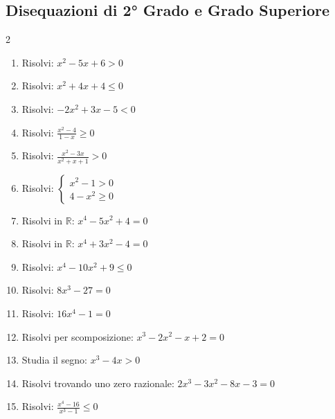 \subsection{Disequazioni di 2° Grado e Grado Superiore}
\begin{multicols}{2}
\begin{enumerate}
    \item {} Risolvi: $x^2 - 5x + 6 > 0$
    \item {} Risolvi: $x^2 + 4x + 4 \le 0$
    \item {} Risolvi: $-2x^2 + 3x - 5 < 0$
    \item {} Risolvi: $\frac{x^2-4}{1-x} \ge 0$
    \item {} Risolvi: $\frac{x^2-3x}{x^2+x+1} > 0$
    \item {} Risolvi: $\begin{cases} x^2-1 > 0 \\ 4-x^2 \ge 0 \end{cases}$
    \item {} Risolvi in $\mathbb{R}$: $x^4 - 5x^2 + 4 = 0$
    \item {} Risolvi in $\mathbb{R}$: $x^4 + 3x^2 - 4 = 0$
    \item {} Risolvi: $x^4 - 10x^2 + 9 \le 0$
    \item {} Risolvi: $8x^3 - 27 = 0$
    \item {} Risolvi: $16x^4 - 1 = 0$
    \item {} Risolvi per scomposizione: $x^3 - 2x^2 - x + 2 = 0$
    \item {} Studia il segno: $x^3 - 4x > 0$
    \item {} Risolvi trovando uno zero razionale: $2x^3 - 3x^2 - 8x - 3 = 0$
    \item {} Risolvi: $\frac{x^4-16}{x^3-1} \le 0$
\end{enumerate}
\end{multicols}


